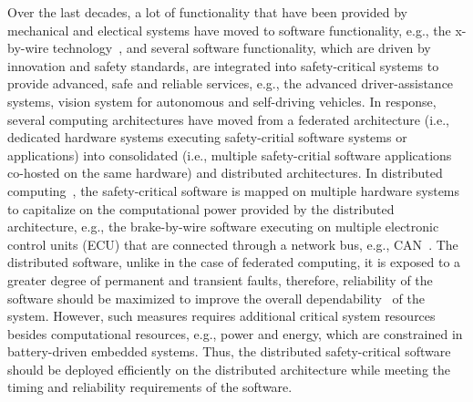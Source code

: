 Over the last decades, a lot of functionality that have been provided by mechanical and electical systems have moved to software functionality, e.g., the x-by-wire technology~\cite{bibid}, and several software functionality, which are driven by innovation and safety standards, are integrated into safety-critical systems to provide advanced, safe and reliable services, e.g., the advanced driver-assistance systems, vision system for autonomous and self-driving vehicles. In response, several computing architectures have moved from a federated architecture (i.e., dedicated hardware systems executing safety-critial software systems or applications) into consolidated (i.e., multiple safety-critial software applications co-hosted on the same hardware) and distributed architectures. In distributed computing~\cite{Kopetz2003Real-timeApplications}, the safety-critical software is mapped on multiple hardware systems to capitalize on the computational power provided by the distributed architecture, e.g., the brake-by-wire software executing on multiple electronic control units (ECU) that are connected through a network bus, e.g., CAN~\cite{}. The distributed software, unlike in the case of federated computing, it is exposed to a greater degree of permanent and transient faults, therefore, reliability of the software should be maximized to improve the overall dependability~\cite{} of the  system. However, such measures requires additional critical system resources besides computational resources, e.g., power and energy, which are constrained in battery-driven embedded systems. Thus, the distributed safety-critical software should be deployed efficiently on the distributed architecture while meeting the timing and reliability requirements of the software.


